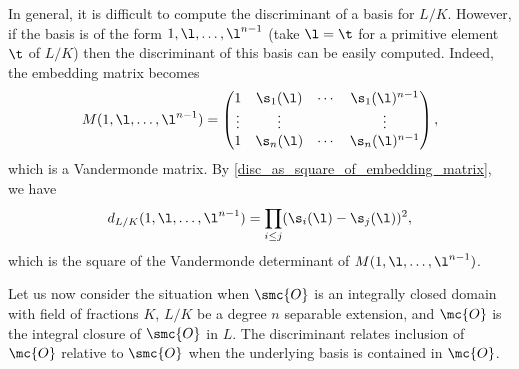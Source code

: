     In general, it is difficult to compute the discriminant of a basis for \(L/K\). However, if the basis is of the form \(1,\l,\ldots,\l^{n-1}\) (take \(\l = \t\) for a primitive element \(\t\) of \(L/K\)) then the discriminant of this basis can be easily computed. Indeed, the embedding matrix becomes
    \[
      M(1,\l,\ldots,\l^{n-1}) = \begin{pmatrix} 1 & \s_{1}(\l) & \cdots & \s_{1}(\l)^{n-1} \\ \vdots & \vdots & & \vdots \\ 1 & \s_{n}(\l) & \cdots & \s_{n}(\l)^{n-1} \end{pmatrix},
    \]
    which is a Vandermonde matrix. By \cref{disc_as_square_of_embedding_matrix}, we have
    \begin{equation}\label{equ:Vandermonde_determinant_for_discriminant}
      d_{L/K}(1,\l,\ldots,\l^{n-1}) = \prod_{i \le j}(\s_{i}(\l)-\s_{j}(\l))^{2},
    \end{equation}
    which is the square of the Vandermonde determinant of \(M(1,\l,\ldots,\l^{n-1})\).

    Let us now consider the situation when \(\smc{O}\) is an integrally closed domain with field of fractions \(K\), \(L/K\) be a degree \(n\) separable extension, and \(\mc{O}\) is the integral closure of \(\smc{O}\) in \(L\). The discriminant relates inclusion of \(\mc{O}\) relative to \(\smc{O}\) when the underlying basis is contained in \(\mc{O}\).

